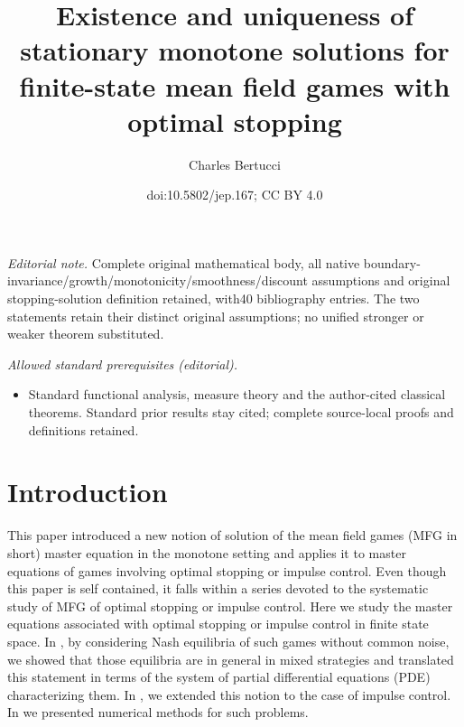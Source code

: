 \documentclass[10pt]{amsart}
\title{Existence and uniqueness of stationary monotone solutions for finite-state mean field games with optimal stopping}
\author{Charles Bertucci}
\date{doi:10.5802/jep.167; CC BY 4.0}
\theoremstyle{definition}
\begin{document}
\maketitle
\noindent\textit{Editorial note.} Complete original mathematical body, all native boundary-invariance/growth/monotonicity/smoothness/discount assumptions and original stopping-solution definition retained, with40 bibliography entries. The two statements retain their distinct original assumptions; no unified stronger or weaker theorem substituted.\par\medskip
\noindent\textit{Allowed standard prerequisites (editorial).}\begin{itemize}
\item Standard functional analysis, measure theory and the author-cited classical theorems. Standard prior results stay cited; complete source-local proofs and definitions retained.
\end{itemize}\medskip
\vspace*{-.5\baselineskip}
\tableofcontents


\section*{Introduction}
This paper introduced a new notion of solution of the mean field games (MFG in short) master equation in the monotone setting and applies it to master equations of games involving optimal stopping or impulse control. Even though this paper is self contained, it falls within a series devoted to the systematic study of MFG of optimal stopping or impulse control. Here we study the master equations associated with optimal stopping or impulse control in finite state space. In \cite{bertucci2018optimal}, by considering Nash equilibria of such games without common noise, we showed that those equilibria are in general in mixed strategies and translated this statement in terms of the system of partial differential equations (PDE) characterizing them. In \cite{bertucci2020fokker}, we extended this notion to the case of impulse control. In \cite{bertucci2020remark} we presented numerical methods for such problems.
\end{document}
